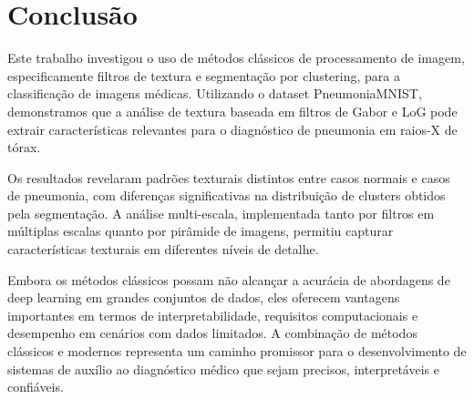 \documentclass[sigconf,nonacm]{acmart}
\begin{document}
\section{Conclusão}

Este trabalho investigou o uso de métodos clássicos de processamento de imagem, especificamente filtros de textura e segmentação por clustering, para a classificação de imagens médicas. Utilizando o dataset PneumoniaMNIST, demonstramos que a análise de textura baseada em filtros de Gabor e LoG pode extrair características relevantes para o diagnóstico de pneumonia em raios-X de tórax.

Os resultados revelaram padrões texturais distintos entre casos normais e casos de pneumonia, com diferenças significativas na distribuição de clusters obtidos pela segmentação. A análise multi-escala, implementada tanto por filtros em múltiplas escalas quanto por pirâmide de imagens, permitiu capturar características texturais em diferentes níveis de detalhe.

Embora os métodos clássicos possam não alcançar a acurácia de abordagens de deep learning em grandes conjuntos de dados, eles oferecem vantagens importantes em termos de interpretabilidade, requisitos computacionais e desempenho em cenários com dados limitados. A combinação de métodos clássicos e modernos representa um caminho promissor para o desenvolvimento de sistemas de auxílio ao diagnóstico médico que sejam precisos, interpretáveis e confiáveis.

\balance


\end{document}
